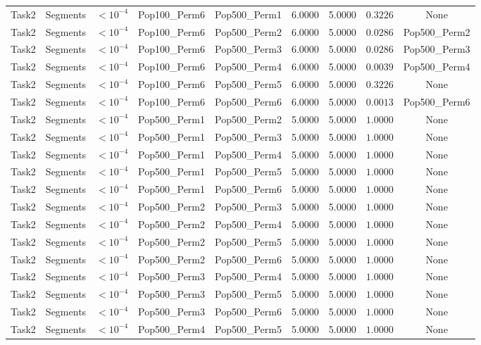 \documentclass[8pt]{article}
\begin{document}
\begin{longtable}{llccccccc}
Task2 & Segments & $< 10^{-4}$ & Pop100\_Perm6 & Pop500\_Perm1 & 6.0000 & 5.0000 & $0.3226$ & None \\
Task2 & Segments & $< 10^{-4}$ & Pop100\_Perm6 & Pop500\_Perm2 & 6.0000 & 5.0000 & $0.0286$ & Pop500\_Perm2 \\
Task2 & Segments & $< 10^{-4}$ & Pop100\_Perm6 & Pop500\_Perm3 & 6.0000 & 5.0000 & $0.0286$ & Pop500\_Perm3 \\
Task2 & Segments & $< 10^{-4}$ & Pop100\_Perm6 & Pop500\_Perm4 & 6.0000 & 5.0000 & $0.0039$ & Pop500\_Perm4 \\
Task2 & Segments & $< 10^{-4}$ & Pop100\_Perm6 & Pop500\_Perm5 & 6.0000 & 5.0000 & $0.3226$ & None \\
Task2 & Segments & $< 10^{-4}$ & Pop100\_Perm6 & Pop500\_Perm6 & 6.0000 & 5.0000 & $0.0013$ & Pop500\_Perm6 \\
Task2 & Segments & $< 10^{-4}$ & Pop500\_Perm1 & Pop500\_Perm2 & 5.0000 & 5.0000 & $1.0000$ & None \\
Task2 & Segments & $< 10^{-4}$ & Pop500\_Perm1 & Pop500\_Perm3 & 5.0000 & 5.0000 & $1.0000$ & None \\
Task2 & Segments & $< 10^{-4}$ & Pop500\_Perm1 & Pop500\_Perm4 & 5.0000 & 5.0000 & $1.0000$ & None \\
Task2 & Segments & $< 10^{-4}$ & Pop500\_Perm1 & Pop500\_Perm5 & 5.0000 & 5.0000 & $1.0000$ & None \\
Task2 & Segments & $< 10^{-4}$ & Pop500\_Perm1 & Pop500\_Perm6 & 5.0000 & 5.0000 & $1.0000$ & None \\
Task2 & Segments & $< 10^{-4}$ & Pop500\_Perm2 & Pop500\_Perm3 & 5.0000 & 5.0000 & $1.0000$ & None \\
Task2 & Segments & $< 10^{-4}$ & Pop500\_Perm2 & Pop500\_Perm4 & 5.0000 & 5.0000 & $1.0000$ & None \\
Task2 & Segments & $< 10^{-4}$ & Pop500\_Perm2 & Pop500\_Perm5 & 5.0000 & 5.0000 & $1.0000$ & None \\
Task2 & Segments & $< 10^{-4}$ & Pop500\_Perm2 & Pop500\_Perm6 & 5.0000 & 5.0000 & $1.0000$ & None \\
Task2 & Segments & $< 10^{-4}$ & Pop500\_Perm3 & Pop500\_Perm4 & 5.0000 & 5.0000 & $1.0000$ & None \\
Task2 & Segments & $< 10^{-4}$ & Pop500\_Perm3 & Pop500\_Perm5 & 5.0000 & 5.0000 & $1.0000$ & None \\
Task2 & Segments & $< 10^{-4}$ & Pop500\_Perm3 & Pop500\_Perm6 & 5.0000 & 5.0000 & $1.0000$ & None \\
Task2 & Segments & $< 10^{-4}$ & Pop500\_Perm4 & Pop500\_Perm5 & 5.0000 & 5.0000 & $1.0000$ & None \\

\end{longtable}
\end{document}
